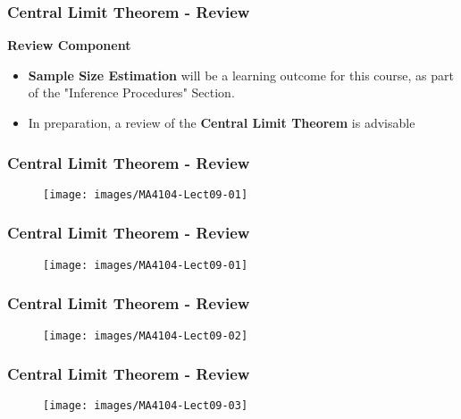 \documentclass{beamer}
\begin{document}
	\begin{frame}
		\frametitle{Central Limit Theorem - Review}
		\Large
		\noindent \textbf{Review Component}
		\begin{itemize}
			\item \textbf{Sample Size Estimation} will be a learning outcome for this course, as part of the "Inference Procedures" Section.
			\item In preparation, a review of the \textbf{Central Limit Theorem} is advisable
		\end{itemize}
		\end{frame}
		
		\begin{frame}
			\frametitle{Central Limit Theorem - Review}
			\begin{figure}
				\centering
				\texttt{[image: images/MA4104-Lect09-01]}
				\caption{}
				\label{fig:MA4104-Lect09-01}
			\end{figure}
		\end{frame}
		\begin{frame}
			\frametitle{Central Limit Theorem - Review}
			\begin{figure}
				\centering
				\texttt{[image: images/MA4104-Lect09-01]}
			\end{figure}
		\end{frame}
		\begin{frame}
			\frametitle{Central Limit Theorem - Review}
			\begin{figure}
				\centering
				\texttt{[image: images/MA4104-Lect09-02]}
			\end{figure}
		\end{frame}
		\begin{frame}
			\frametitle{Central Limit Theorem - Review}
			\begin{figure}
				\centering
				\texttt{[image: images/MA4104-Lect09-03]}
				
			\end{figure}
		\end{frame}
\end{document}

